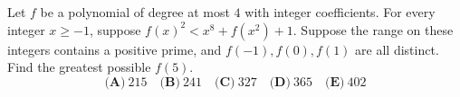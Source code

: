 Let $f$ be a polynomial of degree at most $4$ with integer coefficients. For every integer $x\ge-1$, suppose $f(x)^2<x^8+f(x^2)+1$. Suppose the range on these integers contains a positive prime, and $f(-1),f(0),f(1)$ are all distinct. Find the greatest possible $f(5)$.
\[\textbf{(A)}~215\quad\textbf{(B)}~241\quad\textbf{(C)}~327\quad\textbf{(D)}~365\quad\textbf{(E)}~402\]
